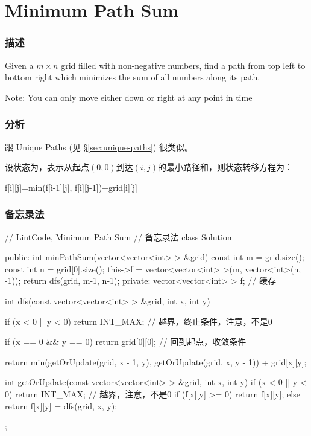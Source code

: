 \section{Minimum Path Sum} %
\label{sec:minimum-path-sum}


\subsubsection{描述}
Given a $m \times n$ grid filled with non-negative numbers, find a path from top left to bottom right which minimizes the sum of all numbers along its path.

Note: You can only move either down or right at any point in time


\subsubsection{分析}
跟 Unique Paths (见 \S \ref{sec:unique-paths}) 很类似。

设状态为，表示从起点$(0,0)$到达$(i,j)$的最小路径和，则状态转移方程为：
\begin{Code}
f[i][j]=min(f[i-1][j], f[i][j-1])+grid[i][j]
\end{Code}


\subsubsection{备忘录法}
\begin{Code}
// LintCode, Minimum Path Sum
// 备忘录法
class Solution {
public:
    int minPathSum(vector<vector<int> > &grid) {
        const int m = grid.size();
        const int n = grid[0].size();
        this->f = vector<vector<int> >(m, vector<int>(n, -1));
        return dfs(grid, m-1, n-1);
    }
private:
    vector<vector<int> > f;  // 缓存

    int dfs(const vector<vector<int> > &grid, int x, int y) {
        if (x < 0 || y < 0) return INT_MAX; // 越界，终止条件，注意，不是0

        if (x == 0 && y == 0) return grid[0][0]; // 回到起点，收敛条件

        return min(getOrUpdate(grid, x - 1, y),
                getOrUpdate(grid, x, y - 1)) + grid[x][y];
    }

    int getOrUpdate(const vector<vector<int> > &grid, int x, int y) {
        if (x < 0 || y < 0) return INT_MAX; // 越界，注意，不是0
        if (f[x][y] >= 0) return f[x][y];
        else return f[x][y] = dfs(grid, x, y);
    }
};
\end{Code}


